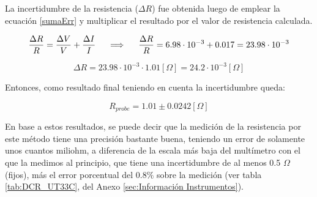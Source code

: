 La incertidumbre de la resistencia ($\Delta R$) fue obtenida luego de emplear la ecuación \ref{sumaErr} y multiplicar el resultado por el valor de resistencia calculada. 

\begin{equation*}
    \frac{\Delta R}{R} = \frac{\Delta V}{V} + \frac{\Delta I}{I}
    \hspace{0.5cm}
    \Longrightarrow
    \hspace{0.5cm}
    \frac{\Delta R}{R} = 6.98 \cdot 10^{-3} + 0.017 = 23.98 \cdot 10^{-3}
\end{equation*}

\begin{equation*}
    \Delta R = 23.98 \cdot 10^{-3} \cdot 1.01 [\Omega] = 24.2 \cdot 10^{-3} [\Omega]
\end{equation*}

Entonces, como resultado final teniendo en cuenta la incertidumbre queda:

\begin{equation*}
    R_{probe} = 1.01 \pm 0.0242 [\Omega]
\end{equation*}

En base a estos resultados, se puede decir que la medición de la resistencia por este método tiene una precisión bastante buena, teniendo un error de solamente unos cuantos miliohm, a diferencia de la escala más baja del multímetro con el que la medimos al principio, que tiene una incertidumbre de al menos 0.5 $\Omega$ (fijos), más el error porcentual del 0.8$\%$ sobre la medición (ver tabla \ref{tab:DCR_UT33C}, del Anexo \ref{sec:Información Instrumentos}).